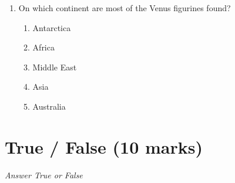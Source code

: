\documentclass[12pt]{article}
\begin{document}
\begin{enumerate}[label=\arabic*.]
\begin{enumerate}[label=(\alph*)]
    \item New Zealand
    \item The Maldives
\end{enumerate}
\item On which continent are most of the Venus figurines found?
\begin{enumerate}[label=(\alph*)]
    \item Antarctica
    \item Africa
    \item Middle East
    \item Asia
    \item Australia
\end{enumerate}
\end{enumerate}

\section*{True / False (10 marks)}
\textit{Answer True or False}
\end{document}
